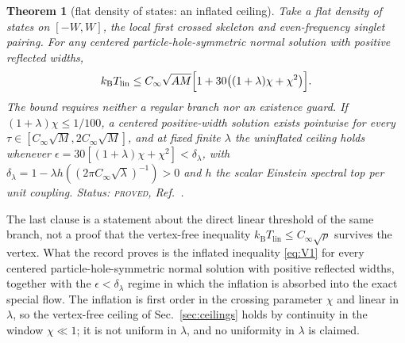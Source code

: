 \documentclass[aps,10pt,superscriptaddress,floatfix,amsmath,amssymb,nofootinbib]{revtex4-2}
\newcommand{\kb}{k_{\mathrm B}}
\newcommand{\Tlin}{T_{\mathrm{lin}}}
\newcommand{\Cinf}{C_\infty}
\newcommand{\PROVED}{\textsc{proved}}
\newtheorem{theorem}{Theorem}
\begin{document}
\begin{theorem}[flat density of states: an inflated ceiling]\label{thm:flatceiling}
Take a flat density of states on $[-W,W]$, the local first crossed skeleton and even-frequency
singlet pairing. For any centered particle-hole-symmetric normal solution with positive
reflected widths,
\begin{equation}\label{eq:V1}
\kb\Tlin\le\Cinf\sqrt{AM}\Bigl[1+30\bigl((1+\lambda)\chi+\chi^{2}\bigr)\Bigr].
\end{equation}
The bound requires neither a regular branch nor an existence guard. If
$(1+\lambda)\chi\le1/100$, a centered positive-width solution exists pointwise for every
$\tau\in[\Cinf\sqrt M,2\Cinf\sqrt M]$, and at fixed finite $\lambda$ the uninflated ceiling
holds whenever $\epsilon=30[(1+\lambda)\chi+\chi^{2}]<\delta_\lambda$, with
$\delta_\lambda=1-\lambda h((2\pi\Cinf\sqrt\lambda)^{-1})>0$ and $h$ the scalar Einstein
spectral top per unit coupling.
Status: \PROVED{}, Ref.~\cite{msvertex}.
\end{theorem}

The last clause is a statement about the direct linear threshold of the same branch, not a
proof that the vertex-free inequality $\kb\Tlin\le\Cinf\sqrt\rho$ survives the vertex. What
the record proves is the inflated inequality \eqref{eq:V1} for every centered
particle-hole-symmetric normal solution with positive reflected widths, together with the
$\epsilon<\delta_\lambda$ regime in which the inflation is absorbed into the exact special
flow. The inflation is first order in the crossing parameter $\chi$ and linear in
$\lambda$, so the
vertex-free ceiling of Sec.~\ref{sec:ceilings} holds by continuity in the window
$\chi\ll1$; it is not uniform in $\lambda$, and no uniformity in $\lambda$ is claimed.
\end{document}
